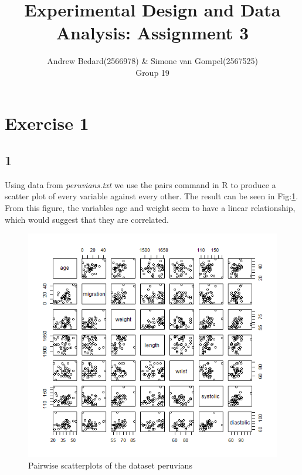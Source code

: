 \documentclass{article}
\title{Experimental Design and Data Analysis: Assignment 3}
\author{Andrew Bedard(2566978) \& Simone van Gompel(2567525) \\ Group 19}
\begin{document}
  \maketitle

  \section{Exercise 1}
  \subsection*{1}
  Using data from \textit{peruvians.txt} we use the pairs command in R to produce a scatter plot of every variable against every other. The result can be seen in Fig:\ref{fig:Pairs}. From this figure, the variables age and weight seem to have a linear relationship, which would suggest that they are correlated.

    \begin{figure}
      \includegraphics[scale=0.6]{../results/Pairs.png}
      \caption{Pairwise scatterplots of the dataset peruvians}
      \label{fig:Pairs}
    \end{figure}
    
\end{document}
